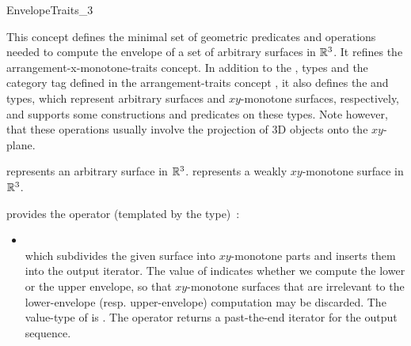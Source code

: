 \ccRefPageBegin

\begin{ccRefConcept}{EnvelopeTraits_3}

\ccDefinition

This concept defines the minimal set of geometric predicates and
operations needed to compute the envelope of a set of arbitrary
surfaces in $\mathbb{R}^3$. It refines the arrangement-x-monotone-traits concept.
In addition to the  ,  types and the
 category tag defined in the arrangement-traits concept ,
it also defines the  and 
types, which represent arbitrary surfaces and $xy$-monotone surfaces,
respectively, and supports some constructions and predicates on these
types. Note however, that these operations usually involve the
projection of 3D objects onto the $xy$-plane.

\ccRefines
{}

\ccTypes

{represents an arbitrary surface in $\mathbb{R}^3$.}
\ccGlue
{}
{represents a weakly $xy$-monotone surface in $\mathbb{R}^3$.}


\ccThreeToTwo

{provides the operator (templated by the  type)~:
 \begin{itemize}
 \item {} \\
 which subdivides the given surface  into $xy$-monotone parts
 and inserts them into the output iterator. The value of
  indicates whether we compute the lower or the upper
 envelope, so that $xy$-monotone surfaces that are irrelevant to the
 lower-envelope (resp. upper-envelope) computation may be discarded.
 The value-type of  is .
 The operator returns a past-the-end iterator for the output sequence.
 \end{itemize}}


\end{ccRefConcept}
